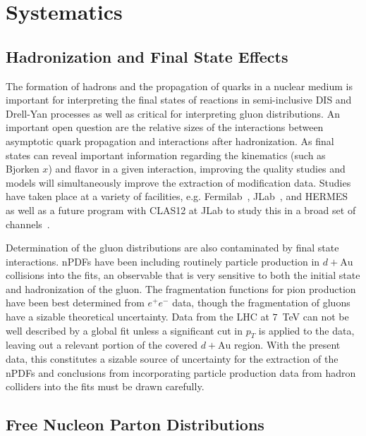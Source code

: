 \section{Systematics\label{sec:systematics}}


\subsection{Hadronization and Final State Effects}

The formation of hadrons and the propagation of quarks in a nuclear medium is important for interpreting the final states of reactions in semi-inclusive DIS and Drell-Yan processes as well as critical for interpreting gluon distributions.  An important open question are the relative sizes of the interactions between asymptotic quark propagation and interactions after hadronization.  As final states can reveal important information regarding the kinematics (such as Bjorken $x$) and flavor in a given interaction, improving the quality studies and models will simultaneously improve the extraction of modification data.  Studies have taken place at a variety of facilities, e.g. Fermilab~\cite{PhysRevC.75.035206}, JLab~\cite{PhysRevLett.99.242502, ELFASSI2012326}, and HERMES~\cite{Airapetian2011} as well as a future program with CLAS12 at JLab to study this in a broad set of channels~\cite{quarkformprop}.

Determination of the gluon distributions are also contaminated by final state interactions. nPDFs have been including routinely particle production in $d+\mathrm{Au}$ collisions into the fits, an observable that is very sensitive to both the initial state and hadronization of the gluon. The fragmentation functions for pion production have been best determined from $e^+e^-$ data, though the fragmentation of gluons have a sizable theoretical uncertainty. Data from the LHC at $7$~TeV can not be well described by a global fit unless a significant cut in $p_{T}$ is applied to the data, leaving out a relevant portion of the covered $d+\mathrm{Au}$ region.  With the present data, this constitutes a sizable source of uncertainty for the extraction of the nPDFs and conclusions from incorporating particle production data from hadron colliders into the fits must be drawn carefully.

\subsection{Free Nucleon Parton Distributions}

